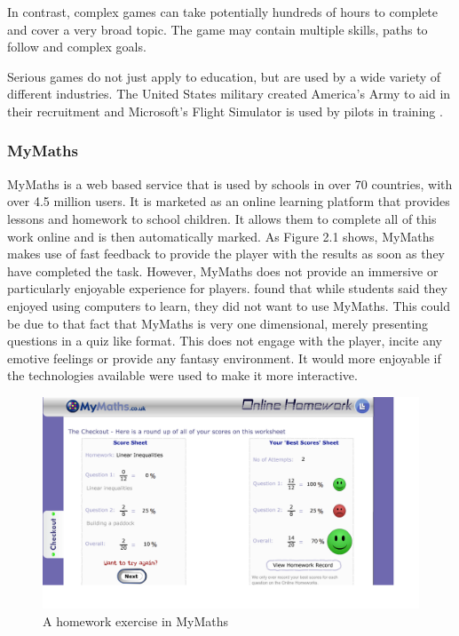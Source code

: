 \documentclass[12pt,a4paper]{report}
\begin{document}
In contrast, complex games can take potentially hundreds of hours to complete and cover a very broad topic. The game may contain multiple skills, paths to follow and complex goals.  

Serious games do not just apply to education, but are used by a wide variety of different industries. The United States military created America's Army to aid in their recruitment and Microsoft's Flight Simulator is used by pilots in training \citep{111701519980901}.


\subsubsection{MyMaths}
MyMaths is a web based service that is used by schools in over 70 countries, with over 4.5 million users. It is marketed as an online learning platform that provides lessons and homework to school children. It allows them to complete all of this work online and is then automatically marked.
As Figure 2.1 shows, MyMaths makes use of fast feedback to provide the player with the results as soon as they have completed the task. However, MyMaths does not provide an immersive or particularly enjoyable experience for players. \cite{lee2013learning} found that while students said they enjoyed using computers to learn, they did not want to use MyMaths. This could be due to that fact that MyMaths is very one dimensional, merely presenting questions in a quiz like format. This does not engage with the player, incite any emotive feelings or provide any fantasy environment. It would more enjoyable if the technologies available were used to make it more interactive.
\begin{figure}[!tbp]
  \centering
  \begin{minipage}[b]{1\textwidth}
    \includegraphics[width=\textwidth]{mymaths}
    \caption{A homework exercise in MyMaths}
  \end{minipage}
\end{figure}
\FloatBarrier
\end{document}
